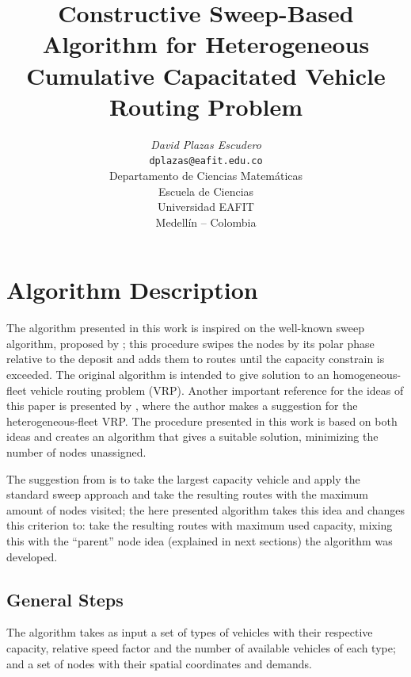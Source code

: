 \documentclass[10pt,twoside]{article}
\title{Constructive Sweep-Based Algorithm for Heterogeneous Cumulative Capacitated Vehicle Routing Problem}
\author{\emph{David Plazas Escudero}\\
\vspace{0.3cm}
\small{\tt{dplazas@eafit.edu.co}}\\
Departamento de Ciencias Matemáticas\\
Escuela de Ciencias\\
Universidad EAFIT\\
Medellín -- Colombia}
\date{}
\begin{document}
\maketitle

\thispagestyle{firststyle}


\section{Algorithm Description}\label{sec_intro}

The algorithm presented in this work is inspired on the well-known sweep algorithm, proposed by \cite{gillett1974heuristic}; this procedure swipes the nodes by its polar phase relative to the deposit and adds them to routes until the capacity constrain is exceeded. The original algorithm is intended to give solution to an homogeneous-fleet vehicle routing problem (VRP). Another important reference for the ideas of this paper is presented by \cite{suthikarnnarunai2008sweep}, where the author makes a suggestion for the heterogeneous-fleet VRP. The procedure presented in this work is based on both ideas and creates an algorithm that gives a suitable solution, minimizing the number of nodes unassigned.

The suggestion from \cite{suthikarnnarunai2008sweep} is to take the largest capacity vehicle and apply the standard sweep approach and take the resulting routes with the maximum amount of nodes visited; the here presented algorithm takes this idea and changes this criterion to: take the resulting routes with maximum used capacity, mixing this with the ``parent'' node idea (explained in next sections) the algorithm was developed.

\subsection{General Steps}
The algorithm takes as input a set of types of vehicles with their respective capacity, relative speed factor and the number of available vehicles of each type; and a set of nodes with their spatial coordinates and demands.
\end{document}
